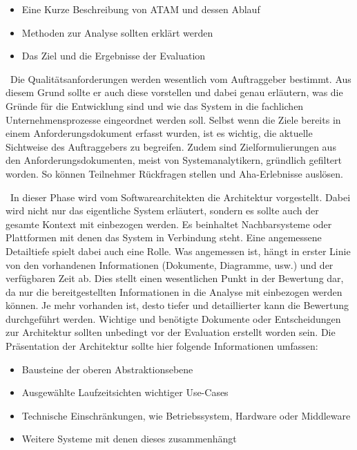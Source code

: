 \begin{itemize}[]
	\item Eine Kurze Beschreibung von ATAM und dessen Ablauf
	\item Methoden zur Analyse sollten erklärt werden
	\item Das Ziel und die Ergebnisse der Evaluation
\end{itemize}

\
Die Qualitätsanforderungen werden wesentlich vom Auftraggeber bestimmt. Aus diesem Grund sollte er auch diese vorstellen und dabei genau erläutern, was die Gründe für die Entwicklung sind und wie das System in die fachlichen Unternehmensprozesse eingeordnet werden soll. Selbst wenn die Ziele bereits in einem Anforderungsdokument erfasst wurden, ist es wichtig, die aktuelle Sichtweise des Auftraggebers zu begreifen. Zudem sind Zielformulierungen aus den Anforderungsdokumenten, meist von Systemanalytikern, gründlich gefiltert worden\cite{Starke2015}. So können Teilnehmer Rückfragen stellen und Aha-Erlebnisse auslösen.

\
In dieser Phase wird vom Softwarearchitekten die Architektur vorgestellt. Dabei wird nicht nur das eigentliche System erläutert, sondern es sollte auch der gesamte Kontext mit einbezogen werden\cite{Starke2015}. Es beinhaltet Nachbarsysteme oder Plattformen mit denen das System in Verbindung steht. Eine angemessene Detailtiefe spielt dabei auch eine Rolle. Was angemessen ist, hängt in erster Linie von den vorhandenen Informationen (Dokumente, Diagramme, usw.) und der verfügbaren Zeit ab. Dies stellt einen wesentlichen Punkt in der Bewertung dar\cite{Clements2000}, da nur die bereitgestellten Informationen in die Analyse mit einbezogen werden können. Je mehr vorhanden ist, desto tiefer und detaillierter kann die Bewertung durchgeführt werden. Wichtige und benötigte Dokumente oder Entscheidungen zur Architektur sollten unbedingt vor der Evaluation erstellt worden sein.
Die Präsentation der Architektur sollte hier folgende Informationen umfassen\cites{Clements2000}{Starke2015}:

\begin{itemize}[]
	\item Bausteine der oberen Abstraktionsebene
	\item Ausgewählte Laufzeitsichten wichtiger Use-Cases
	\item Technische Einschränkungen, wie Betriebssystem, Hardware oder Middleware
	\item Weitere Systeme mit denen dieses zusammenhängt 
\end{itemize}
